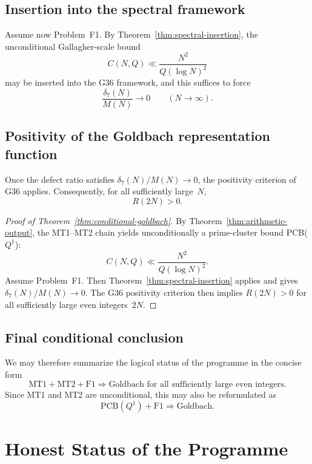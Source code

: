 \documentclass[11pt,a4paper]{article}
\begin{document}
\subsection{Insertion into the spectral framework}

Assume now Problem~F1. By Theorem~\ref{thm:spectral-insertion}, the unconditional Gallagher-scale bound
\[
C(N,Q) \ll \frac{N^2}{Q(\log N)^2}
\]
may be inserted into the G36 framework, and this suffices to force
\[
\frac{\delta_7(N)}{M(N)} \to 0 \qquad (N \to \infty).
\]

\subsection{Positivity of the Goldbach representation function}

Once the defect ratio satisfies $\delta_7(N)/M(N) \to 0$, the positivity criterion of G36 applies. Consequently, for all sufficiently large~$N$,
\[
R(2N) > 0.
\]

\begin{proof}[Proof of Theorem~\ref{thm:conditional-goldbach}]
By Theorem~\ref{thm:arithmetic-output}, the MT1--MT2 chain yields unconditionally a prime-cluster bound PCB($Q^1$):
\[
C(N,Q) \ll \frac{N^2}{Q(\log N)^2}.
\]
Assume Problem~F1. Then Theorem~\ref{thm:spectral-insertion} applies and gives $\delta_7(N)/M(N) \to 0$. The G36 positivity criterion then implies $R(2N) > 0$ for all sufficiently large even integers~$2N$.
\end{proof}

\subsection{Final conditional conclusion}

We may therefore summarize the logical status of the programme in the concise form
\[
\boxed{
\text{MT1} + \text{MT2} + \text{F1}
\Longrightarrow
\text{Goldbach for all sufficiently large even integers}.
}
\]
Since MT1 and MT2 are unconditional, this may also be reformulated as
\[
\boxed{
\text{PCB}(Q^1) + \text{F1}
\Longrightarrow
\text{Goldbach}.
}
\]

\section{Honest Status of the Programme}
\end{document}
